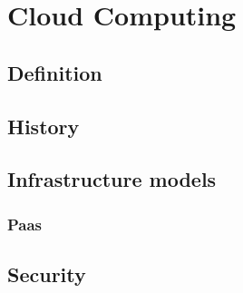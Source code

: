 \chapter{Cloud Computing}
\section{Definition}
\section{History}
\section{Infrastructure models}
\subsection{Paas}
\section{Security}



